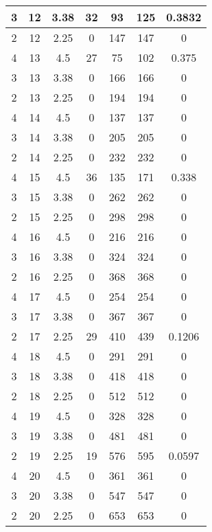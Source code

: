 \documentclass[letterpaper, 12pt]{article}
\begin{document}
\begin{longtable}{|c|c|c|c|c|c|c|}
\hline
3 & 12 & 3.38 & 32 & 93 & 125 & 0.3832 \\
\hline
2 & 12 & 2.25 & 0 & 147 & 147 & 0 \\
\hline
4 & 13 & 4.5 & 27 & 75 & 102 & 0.375 \\
\hline
3 & 13 & 3.38 & 0 & 166 & 166 & 0 \\
\hline
2 & 13 & 2.25 & 0 & 194 & 194 & 0 \\
\hline
4 & 14 & 4.5 & 0 & 137 & 137 & 0 \\
\hline
3 & 14 & 3.38 & 0 & 205 & 205 & 0 \\
\hline
2 & 14 & 2.25 & 0 & 232 & 232 & 0 \\
\hline
4 & 15 & 4.5 & 36 & 135 & 171 & 0.338 \\
\hline
3 & 15 & 3.38 & 0 & 262 & 262 & 0 \\
\hline
2 & 15 & 2.25 & 0 & 298 & 298 & 0 \\
\hline
4 & 16 & 4.5 & 0 & 216 & 216 & 0 \\
\hline
3 & 16 & 3.38 & 0 & 324 & 324 & 0 \\
\hline
2 & 16 & 2.25 & 0 & 368 & 368 & 0 \\
\hline
4 & 17 & 4.5 & 0 & 254 & 254 & 0 \\
\hline
3 & 17 & 3.38 & 0 & 367 & 367 & 0 \\
\hline
2 & 17 & 2.25 & 29 & 410 & 439 & 0.1206 \\
\hline
4 & 18 & 4.5 & 0 & 291 & 291 & 0 \\
\hline
3 & 18 & 3.38 & 0 & 418 & 418 & 0 \\
\hline
2 & 18 & 2.25 & 0 & 512 & 512 & 0 \\
\hline
4 & 19 & 4.5 & 0 & 328 & 328 & 0 \\
\hline
3 & 19 & 3.38 & 0 & 481 & 481 & 0 \\
\hline
2 & 19 & 2.25 & 19 & 576 & 595 & 0.0597 \\
\hline
4 & 20 & 4.5 & 0 & 361 & 361 & 0 \\
\hline
3 & 20 & 3.38 & 0 & 547 & 547 & 0 \\
\hline
2 & 20 & 2.25 & 0 & 653 & 653 & 0 \\
\hline
\end{longtable}
\end{document}
